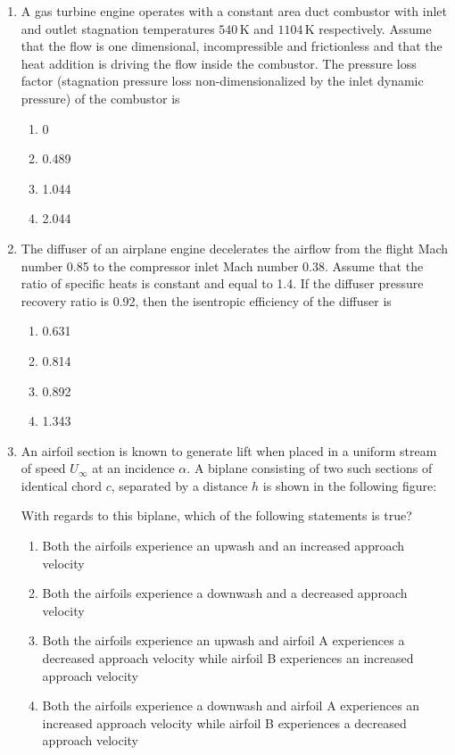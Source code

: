 \documentclass{article}
\begin{document}
\begin{enumerate}
    \item A gas turbine engine operates with a constant area duct combustor with inlet and outlet stagnation temperatures $540 \, \mathrm{K}$ and $1104 \, \mathrm{K}$ respectively. Assume that the flow is one dimensional, incompressible and frictionless and that the heat addition is driving the flow inside the combustor. The pressure loss factor (stagnation pressure loss non-dimensionalized by the inlet dynamic pressure) of the combustor is
    \begin{multicols}{4}
    \begin{enumerate}
        \item 0
        \item 0.489
        \item 1.044
        \item 2.044
    \end{enumerate}
    \end{multicols}
    

    \item The diffuser of an airplane engine decelerates the airflow from the flight Mach number 0.85 to the compressor inlet Mach number 0.38. Assume that the ratio of specific heats is constant and equal to 1.4. If the diffuser pressure recovery ratio is 0.92, then the isentropic efficiency of the diffuser is
    \begin{multicols}{4}
    \begin{enumerate}
        \item 0.631
        \item 0.814
        \item 0.892
        \item 1.343
    \end{enumerate}
    \end{multicols}
    

    \item An airfoil section is known to generate lift when placed in a uniform stream of speed $U_\infty$ at an incidence $\alpha$. A biplane consisting of two such sections of identical chord $c$, separated by a distance $h$ is shown in the following figure:
    \begin{figure}[H]
        \centering
        
        \caption{}
        \label{fig:q60}
    \end{figure}
    With regards to this biplane, which of the following statements is true?
    \begin{enumerate}
        \item Both the airfoils experience an upwash and an increased approach velocity
        \item Both the airfoils experience a downwash and a decreased approach velocity
        \item Both the airfoils experience an upwash and airfoil A experiences a decreased approach velocity while airfoil B experiences an increased approach velocity
        \item Both the airfoils experience a downwash and airfoil A experiences an increased approach velocity while airfoil B experiences a decreased approach velocity
    \end{enumerate}


\end{enumerate}
\end{document}
